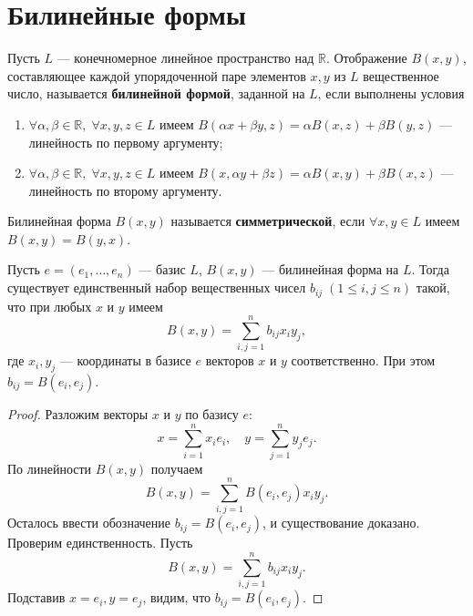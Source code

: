 \documentclass[12pt]{article}
\begin{document}
\section{Билинейные формы}

\begin{definition}
Пусть \(L\) — конечномерное линейное пространство над \(\mathbb{R}\). Отображение \(B(x, y)\), составляющее каждой упорядоченной паре элементов \(x, y\) из \(L\) вещественное число, называется \textbf{билинейной формой}, заданной на \(L\), если выполнены условия
\begin{enumerate}
    \item \(\forall \alpha, \beta \in \mathbb{R},\; \forall x, y, z \in L\) имеем \(B(\alpha x + \beta y, z) = \alpha B(x, z) + \beta B(y, z)\) --- линейность по первому аргументу;
    \item \(\forall \alpha, \beta \in \mathbb{R},\; \forall x, y, z \in L\) имеем \(B(x, \alpha y + \beta z) = \alpha B(x, y) + \beta B(x, z)\) --- линейность по второму аргументу.
\end{enumerate}
\end{definition}

\begin{definition}
Билинейная форма \(B(x, y)\) называется \textbf{симметрической}, если \(\forall x, y \in L\) имеем \(B(x, y) = B(y, x)\).
\end{definition}

\begin{theorem}
Пусть \(e = (e_1, \dots, e_n)\) — базис \(L\), \(B(x, y)\) — билинейная форма на \(L\). Тогда существует единственный набор вещественных чисел \(b_{ij}\;(1 \le i, j \le n)\) такой, что при любых \(x\) и \(y\) имеем
\begin{equation} \label{eq:bilinear_gen}
B(x, y) = \sum_{i,j=1}^{n} b_{ij} x_i y_j,
\end{equation}
где \(x_i, y_j\) — координаты в базисе \(e\) векторов \(x\) и \(y\) соответственно. При этом \(b_{ij} = B(e_i, e_j)\).
\end{theorem}

\begin{proof}
Разложим векторы \(x\) и \(y\) по базису \(e\):
\[
x = \sum_{i=1}^{n} x_i e_i, \quad y = \sum_{j=1}^{n} y_j e_j.
\]
По линейности \(B(x, y)\) получаем
\[
B(x, y) = \sum_{i,j=1}^{n} B(e_i, e_j) x_i y_j.
\]
Осталось ввести обозначение \(b_{ij} = B(e_i, e_j)\), и существование доказано. Проверим единственность. Пусть
\[
B(x, y) = \sum_{i,j=1}^{n} b_{ij} x_i y_j.
\]
Подставив \(x = e_i, y = e_j\), видим, что \(b_{ij} = B(e_i, e_j)\).
\end{proof}
\end{document}
